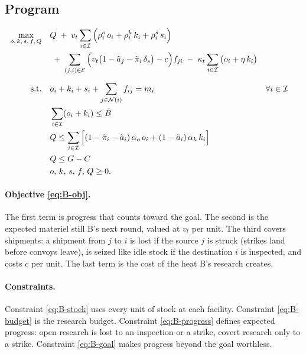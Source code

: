 \documentclass[11pt]{article}
\newcommand{\I}{\mathcal{I}}
\newcommand{\Nb}{\mathcal{N}}
\newcommand{\E}{\mathcal{E}}
\begin{document}
\subsection{Program}

\begin{align}
\max_{o, \, k, \, s, \, f, \, Q} \quad
  & Q
  \;+\; v_t \sum_{i \in \I} \Big( \rho_i^o \, o_i + \rho_i^k \, k_i + \rho_i^s \, s_i \Big)
  \notag \\
  & \;+\; \sum_{(j,i) \in \E} \Big( v_t \big( 1 - \tilde a_j - \tilde\pi_i \, \delta_s \big) - c \Big) f_{ji}
  \;-\; \kappa_t \sum_{i \in \I} \big( o_i + \eta \, k_i \big)
  \label{eq:B-obj} \\[6pt]
\text{s.t.} \quad
  & o_i + k_i + s_i + \sum_{j \in \Nb(i)} f_{ij} = m_i
  && \forall i \in \I
  \label{eq:B-stock} \\
  & \sum_{i \in \I} ( o_i + k_i ) \le \bar B
  \label{eq:B-budget} \\
  & Q \le \sum_{i \in \I} \Big[ ( 1 - \tilde\pi_i - \tilde a_i ) \, \alpha_o \, o_i
        + ( 1 - \tilde a_i ) \, \alpha_k \, k_i \Big]
  \label{eq:B-progress} \\
  & Q \le G - C
  \label{eq:B-goal} \\
  & o, \, k, \, s, \, f, \, Q \ge 0 .
  \notag
\end{align}

\paragraph{Objective \eqref{eq:B-obj}.}
The first term is progress that counts toward the goal. The second is the expected materiel still
B's next round, valued at $v_t$ per unit. The third covers shipments: a shipment from $j$ to $i$
is lost if the source $j$ is struck (strikes land before convoys leave), is seized like idle stock
if the destination $i$ is inspected, and costs $c$ per unit. The last term is the cost of the heat
B's research creates.

\paragraph{Constraints.}
Constraint \eqref{eq:B-stock} uses every unit of stock at each facility. Constraint
\eqref{eq:B-budget} is the research budget. Constraint \eqref{eq:B-progress} defines expected
progress: open research is lost to an inspection or a strike, covert research only to a strike.
Constraint \eqref{eq:B-goal} makes progress beyond the goal worthless.
\end{document}
